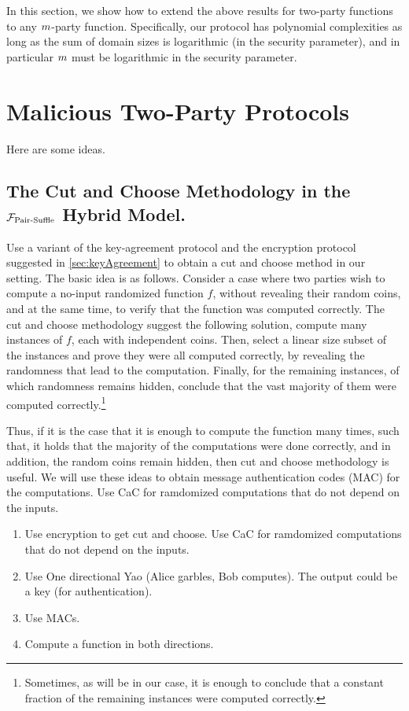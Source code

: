 In this section, we show how to extend the above results for two-party functions to any $m$-party function. Specifically, our protocol has polynomial complexities as long as the sum of domain sizes is logarithmic (in the security parameter), and in particular $m$ must be logarithmic in the security parameter.










\section{Malicious Two-Party Protocols}

Here are some ideas.
\subsection{The Cut and Choose Methodology in the ${\cal F}_{\operatorname{Pair-Suffle}}$ Hybrid Model.}\label{sec:CaC}

 Use a variant of the key-agreement protocol and the encryption protocol suggested in \cref{sec:keyAgreement} to obtain a cut and choose method in our setting. The basic idea is as follows. Consider a case where two parties wish to compute a no-input randomized function $f$, without revealing their random coins, and at the same time, to verify that the function was computed correctly. 
 The cut and choose methodology suggest the following solution, compute many instances of $f$, each with independent coins. Then, select a linear size subset of the instances and prove they were all computed correctly, by revealing the randomness that lead to the computation. Finally, for the remaining instances, of which randomness remains hidden, conclude that the vast majority of them were computed correctly.\footnote{Sometimes, as will be in our case, it is enough to conclude that a constant fraction of the remaining instances were computed correctly.}   
 
 Thus, if it is the case that it is enough to compute the function many times, such that, it holds that the majority of the computations were done correctly, and in addition, the random coins remain hidden, then cut and choose methodology is useful. We will use these ideas to obtain message authentication codes (MAC) for the computations.  
 Use CaC for ramdomized computations that do not depend on the inputs.
\begin{enumerate}
    \item Use encryption to get cut and choose. Use CaC for ramdomized computations that do not depend on the inputs.
    \item Use One directional Yao (Alice garbles, Bob computes). The output could be a key (for authentication).
    
    \item Use MACs.
    \item Compute a function in both directions.
\end{enumerate}

